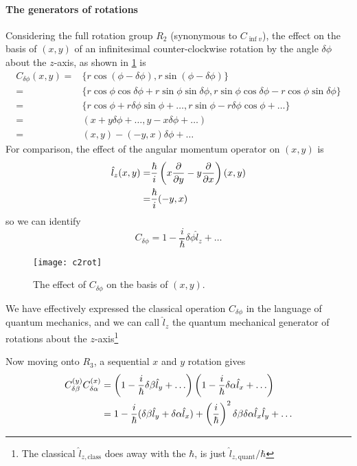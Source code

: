 \paragraph{The generators of rotations}
Considering the full rotation group $R_2$ (synonymous to $C_{\inf v}$), the effect on the basis of $(x,y)$ of an infinitesimal counter-clockwise rotation by the angle $\delta\phi$ about the $z$-axis, as shown in \cref{fig:c2rot} is
\begin{equation}
\begin{aligned}
	C_{\delta\phi}(x,y)=&\{r\cos(\phi-\delta\phi),r\sin(\phi-\delta\phi) \}\\
	=&\{r\cos\phi\cos\delta\phi+r\sin\phi\sin\delta\phi,r\sin\phi\cos\delta\phi-r\cos\phi\sin\delta\phi \}
\\
	=&\{r\cos\phi+r\delta\phi\sin\phi+\dots,r\sin\phi-r\delta\phi\cos\phi+\dots \}\\
	=&(x+y\delta\phi+\dots,y-x\delta\phi+\dots)\\
	=&(x,y)-(-y,x)\delta\phi+\dots
\end{aligned}
\end{equation}
For comparison, the effect of the angular momentum operator on $(x,y)$ is
\begin{equation}
\begin{aligned}
	\hat{l}_z(x,y)=&\frac{\hbar}{i}\lf(x\diffp{}{y}-y\diffp{}{x} \rt)(x,y)\\
	=&\frac{\hbar}{i}(-y,x)
\end{aligned}
\end{equation}
so we can identify
\begin{equation}
	C_{\delta\phi}=1-\frac{i}{\hbar}\delta\phi\hat{l}_z+\dots
\end{equation}
\begin{figure}[H]
	\texttt{[image: c2rot]}
	\centering
	\caption{The effect of $C_{\delta\phi}$ on the basis of $(x,y)$.}
	\label{fig:c2rot}
\end{figure}
We have effectively expressed the classical operation $C_{\delta\phi}$ in the language of quantum mechanics, and we can call $\hat{l}_z$ the quantum mechanical generator of rotations about the $z$-axis\footnote{The classical $\hat{l}_{z,\text{class}}$ does away with the $\hbar$, \ie is just $\hat{l}_{z,\text{quant}}/\hbar$}\par
Now moving onto $R_3$, a sequential $x$ and $y$ rotation gives
\begin{equation}
\begin{aligned}
	C_{\delta\beta}^{(y)}C_{\delta\alpha}^{(x)}&=\lf(1-\frac{i}{\hbar}\delta\beta\hat{l}_y+\dots \rt)\lf(1-\frac{i}{\hbar}\delta\alpha\hat{l}_x+\dots \rt)\\
	&=1-\frac{i}{\hbar}(\delta\beta\hat{l}_y+\delta\alpha\hat{l}_x)+\lf(\frac{i}{\hbar} \rt)^2\delta\beta\delta\alpha\hat{l}_x\hat{l}_y+\dots
\end{aligned}
\end{equation}
